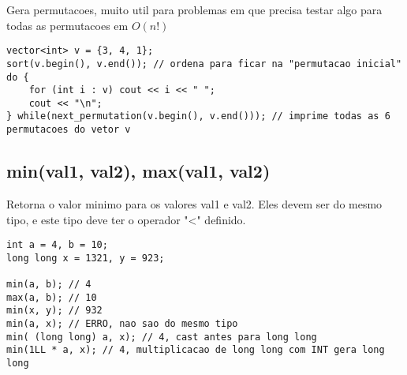 Gera permutacoes, muito util para problemas em que precisa testar algo para todas as permutacoes em $O(n!)$

\begin{lstlisting}
vector<int> v = {3, 4, 1};
sort(v.begin(), v.end()); // ordena para ficar na "permutacao inicial"
do {
	for (int i : v) cout << i << " ";
	cout << "\n";
} while(next_permutation(v.begin(), v.end())); // imprime todas as 6 permutacoes do vetor v
\end{lstlisting}

\subsection{min(val1, val2), max(val1, val2)}

Retorna o valor minimo para os valores val1 e val2. Eles devem ser do mesmo tipo, e este tipo deve ter o operador "<" definido.

\begin{lstlisting}
int a = 4, b = 10;
long long x = 1321, y = 923;

min(a, b); // 4
max(a, b); // 10
min(x, y); // 932
min(a, x); // ERRO, nao sao do mesmo tipo
min( (long long) a, x); // 4, cast antes para long long
min(1LL * a, x); // 4, multiplicacao de long long com INT gera long long
\end{lstlisting}
